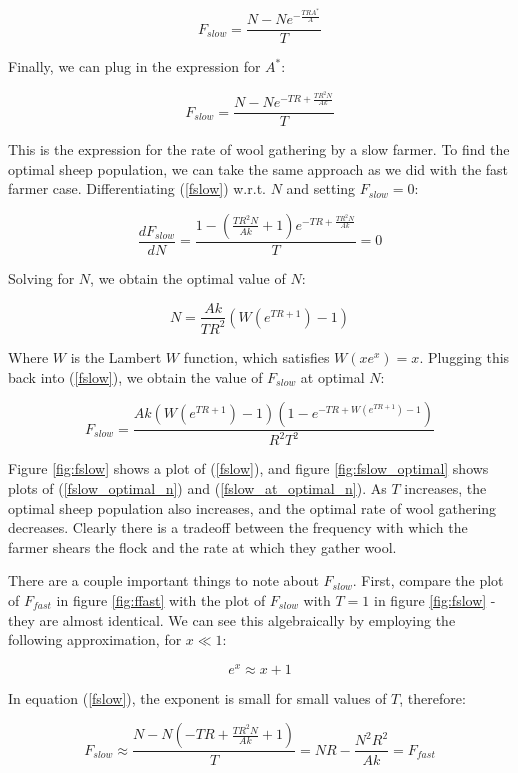 \documentclass{article}
\begin{document}
$$F_{slow}=\frac{N-Ne^{-\frac{TRA^*}{A}}}{T}$$

Finally, we can plug in the expression for $A^*$:

\begin{equation}
    \label{fslow}
F_{slow}=\frac{N-Ne^{-TR+\frac{TR^2N}{Ak}}}{T}
\end{equation}

This is the expression for the rate of wool gathering by a slow farmer. To find the optimal sheep population, we can take the same approach as we did with the fast farmer case. Differentiating (\ref{fslow}) w.r.t. $N$ and setting $F_{slow}=0$:

$$\frac{dF_{slow}}{dN}=\frac{1-\left(\frac{TR^2N}{Ak}+1\right)e^{-TR+\frac{TR^2N}{Ak}}}{T}=0$$

Solving for $N$, we obtain the optimal value of $N$:

\begin{equation}
    \label{fslow_optimal_n}
    N=\frac{Ak}{TR^2}(W(e^{TR+1})-1) 
\end{equation}

Where $W$ is the Lambert $W$ function, which satisfies $W(xe^x)=x$. Plugging this back into (\ref{fslow}), we obtain the value of $F_{slow}$ at optimal $N$:

\begin{equation}
    \label{fslow_at_optimal_n}
    F_{slow}=\frac{Ak(W(e^{TR+1})-1)(1-e^{-TR+W(e^{TR+1})-1})}{R^2T^2}
\end{equation}

Figure \ref{fig:fslow} shows a plot of (\ref{fslow}), and figure \ref{fig:fslow_optimal} shows plots of (\ref{fslow_optimal_n}) and (\ref{fslow_at_optimal_n}). As $T$ increases, the optimal sheep population also increases, and the optimal rate of wool gathering decreases. Clearly there is a tradeoff between the frequency with which the farmer shears the flock and the rate at which they gather wool.

There are a couple important things to note about $F_{slow}$. First, compare the plot of $F_{fast}$ in figure \ref{fig:ffast} with the plot of $F_{slow}$ with $T=1$ in figure \ref{fig:fslow} - they are almost identical. We can see this algebraically by employing the following approximation, for $x\ll 1$:

$$e^x\approx x+1$$

In equation (\ref{fslow}), the exponent is small for small values of $T$, therefore:

$$F_{slow}\approx \frac{N-N(-TR+\frac{TR^2N}{Ak}+1)}{T}=NR-\frac{N^2R^2}{Ak}=F_{fast}$$
\end{document}
